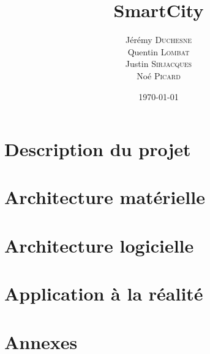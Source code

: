 \documentclass[12pt,a4paper]{article}
\title{SmartCity}
\author{Jérémy \textsc{Duchesne}\\Quentin \textsc{Lombat}\\Justin \textsc{Sirjacques}\\Noé \textsc{Picard}}
\date{\today}
\begin{document}


\tableofcontents

\newpage
\section{Description du projet}

\newpage




\newpage
\section{Architecture matérielle}



\newpage
\section{Architecture logicielle}




\newpage
\section{Application à la réalité}



\newpage
\section{Annexes}

\end{document}
